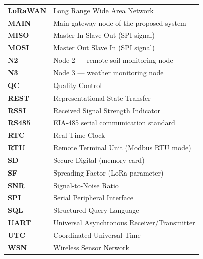 \begin{tabular}{p{3.5cm} p{10cm}}
\textbf{LoRaWAN} & Long Range Wide Area Network \\[3pt]
\textbf{MAIN} & Main gateway node of the proposed system \\[3pt]
\textbf{MISO} & Master In Slave Out (SPI signal) \\[3pt]
\textbf{MOSI} & Master Out Slave In (SPI signal) \\[3pt]
\textbf{N2}   & Node 2 — remote soil monitoring node \\[3pt]
\textbf{N3}   & Node 3 — weather monitoring node \\[3pt]
\textbf{QC}   & Quality Control \\[3pt]
\textbf{REST} & Representational State Transfer \\[3pt]
\textbf{RSSI} & Received Signal Strength Indicator \\[3pt]
\textbf{RS485}& EIA-485 serial communication standard \\[3pt]
\textbf{RTC}  & Real-Time Clock \\[3pt]
\textbf{RTU}  & Remote Terminal Unit (Modbus RTU mode) \\[3pt]
\textbf{SD}   & Secure Digital (memory card) \\[3pt]
\textbf{SF}   & Spreading Factor (LoRa parameter) \\[3pt]
\textbf{SNR}  & Signal-to-Noise Ratio \\[3pt]
\textbf{SPI}  & Serial Peripheral Interface \\[3pt]
\textbf{SQL}  & Structured Query Language \\[3pt]
\textbf{UART} & Universal Asynchronous Receiver/Transmitter \\[3pt]
\textbf{UTC}  & Coordinated Universal Time \\[3pt]
\textbf{WSN}  & Wireless Sensor Network \\[3pt]
\end{tabular}
